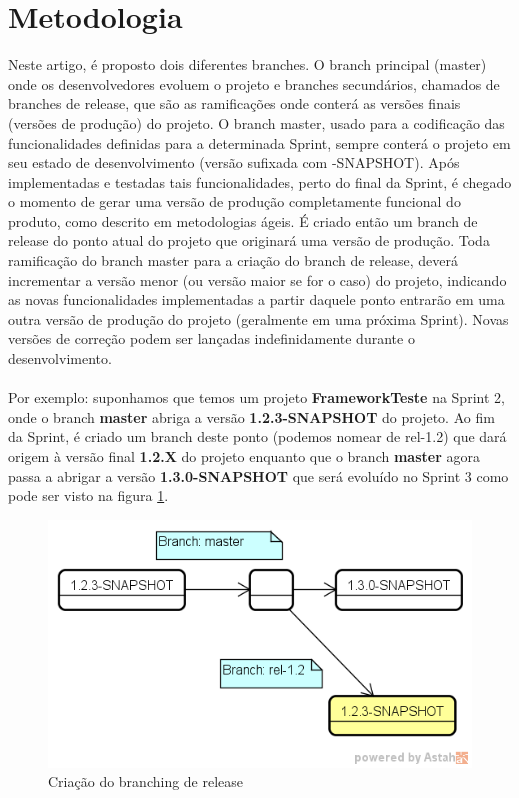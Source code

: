 \section{Metodologia}
\label{sec:metodologia}
Neste artigo, {\'e} proposto dois diferentes branches. O branch principal (master) onde os desenvolvedores evoluem o projeto e branches secund{\'a}rios, chamados de branches de release, que s{\~a}o as ramifica{\c c}ões onde conter{\'a} as versões finais (versões de produ{\c c}{\~a}o) do projeto.
O branch master, usado para a codifica{\c c}{\~a}o das funcionalidades definidas para a determinada Sprint, sempre conter{\'a} o projeto em seu estado de desenvolvimento (vers{\~a}o sufixada com -SNAPSHOT). Ap{\'o}s implementadas e testadas tais funcionalidades, perto do final da Sprint, {\'e} chegado o momento de gerar uma vers{\~a}o de produ{\c c}{\~a}o completamente funcional do produto, como descrito em metodologias {\'a}geis. É criado ent{\~a}o um branch de release do ponto atual do projeto que originar{\'a} uma vers{\~a}o de produ{\c c}{\~a}o. Toda ramifica{\c c}{\~a}o do branch master para a cria{\c c}{\~a}o do branch de release, dever{\'a} incrementar a vers{\~a}o menor (ou vers{\~a}o maior se for o caso) do projeto, indicando as novas funcionalidades implementadas a partir daquele ponto entrar{\~a}o em uma outra vers{\~a}o de produ{\c c}{\~a}o do projeto (geralmente em uma pr{\'o}xima Sprint). Novas versões de corre{\c c}{\~a}o podem ser lan{\c c}adas indefinidamente durante o desenvolvimento.
\\\\
Por exemplo: suponhamos que temos um projeto \textbf{FrameworkTeste} na Sprint 2, onde o branch \textbf{master} abriga a vers{\~a}o \textbf{1.2.3-SNAPSHOT} do projeto. Ao fim da Sprint, {\'e} criado um branch deste ponto (podemos nomear de rel-1.2) que dar{\'a} origem à vers{\~a}o final \textbf{1.2.X} do projeto enquanto que o branch \textbf{master} agora passa a abrigar a vers{\~a}o \textbf{1.3.0-SNAPSHOT} que ser{\'a} evolu{\'i}do no Sprint 3 como pode ser visto na figura \ref{fig:branchingrelease}.

\begin{figure}[h!]
	\centering
	\includegraphics[width=0.7\linewidth]{img/branching_otojr_01}
	\caption[Branching de Release]{Cria{\c c}{\~a}o do branching de release}
	\label{fig:branchingrelease}
\end{figure}

